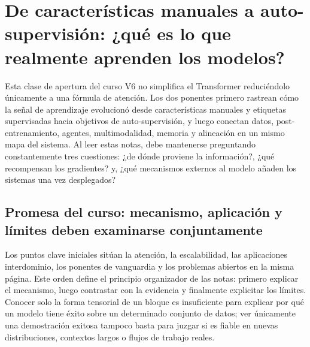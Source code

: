 \section{De características manuales a auto-supervisión: ¿qué es lo que realmente aprenden los modelos?}

Esta clase de apertura del curso V6 no simplifica el Transformer reduciéndolo únicamente a una fórmula de atención. Los dos ponentes primero rastrean cómo la señal de aprendizaje evolucionó desde características manuales y etiquetas supervisadas hacia objetivos de auto-supervisión, y luego conectan datos, post-entrenamiento, agentes, multimodalidad, memoria y alineación en un mismo mapa del sistema. Al leer estas notas, debe mantenerse preguntando constantemente tres cuestiones: ¿de dónde proviene la información?, ¿qué recompensan los gradientes? y, ¿qué mecanismos externos al modelo añaden los sistemas una vez desplegados?

\subsection{Promesa del curso: mecanismo, aplicación y límites deben examinarse conjuntamente}

Los puntos clave iniciales sitúan la atención, la escalabilidad, las aplicaciones interdominio, los ponentes de vanguardia y los problemas abiertos en la misma página. Este orden define el principio organizador de las notas: primero explicar el mecanismo, luego contrastar con la evidencia y finalmente explicitar los límites. Conocer solo la forma tensorial de un bloque es insuficiente para explicar por qué un modelo tiene éxito sobre un determinado conjunto de datos; ver únicamente una demostración exitosa tampoco basta para juzgar si es fiable en nuevas distribuciones, contextos largos o flujos de trabajo reales.



